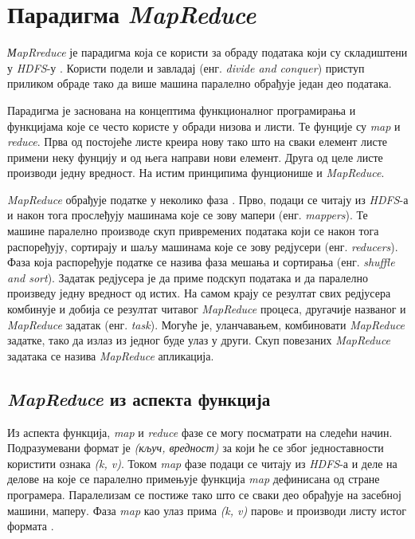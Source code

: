 \documentclass[12pt,oneside]{memoir}
\begin{document}

\section{Парадигма \textit{MapReduce}}
\label{sec:mr}

\textit{МapRreduce} је парадигма која се користи за обраду података који су складиштени у \textit{HDFS}-у \cite{hadoop_beginner}. Користи подели и завладај (енг. \textit{divide and conquer}) приступ приликом обраде тако да више машина паралелно обрађује један део података.

Парадигма је заснована на концептима функционалног програмирања и функцијама које се често користе у обради низова и листи. Те фунције су \textit{map} и \textit{reduce}. Прва од постојеће листе креира нову тако што на сваки елемент листе примени неку фунцију и од њега направи нови елемент. Друга од целе листе производи једну вредност. На истим принципима фунционише и \textit{MapReduce}.

\textit{MapReduce} обрађује податке у неколико фаза \cite{hadoop_learning}. Прво, подаци се читају из \textit{HDFS}-а и након тога прослеђују машинама које се зову мапери (енг. \textit{mappers}). Те машине паралелно производе скуп привремених података који се након тога распоређују, сортирају и шаљу машинама које се зову редјусери (енг. \textit{reducers}). Фаза која распоређује податке се назива фаза мешања и сортирања (енг. \textit{shuffle and sort}). Задатак редјусера је да приме подскуп података и да паралелно произведу једну вредност од истих. На самом крају се резултат свих редјусера комбинује и добија се резултат читавог \textit{MapReduce} процеса, другачије названог и \textit{MapReduce} задатак (енг. \textit{task}). Могуће је, уланчавањем, комбиновати \textit{MapReduce} задатке, тако да излаз из једног буде улаз у други. Скуп повезаних \textit{MapReduce} задатака се назива \textit{MapReduce} апликација.

\subsection{\textit{MapReduce} из аспекта функција}
\label{subsec:mr_funck_asp}

Из аспекта функција, \textit{map} и \textit{reduce} фазе се могу посматрати на следећи начин. Подразумевани формат је \textit{(кључ, вредност)} за који ће се због једноставности користити ознака \textit{(k, v)}. Током \textit{map} фазе подаци се читају из \textit{HDFS}-а и деле на делове на које се паралелно примењује функција \textit{map} дефинисана од стране програмера. Паралелизам се постиже тако што се сваки део обрађује на засебној машини, маперу. Фаза \textit{map} као улаз прима \textit{(k, v)} паровe и производи листу истог формата \cite{hadoop_learning}.
\end{document}
